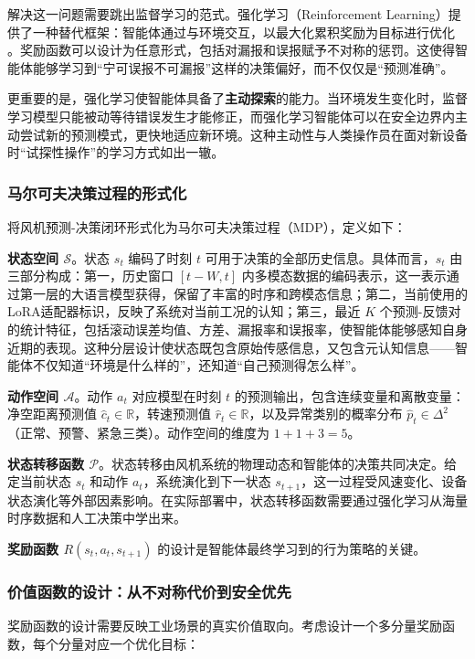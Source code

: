 \documentclass[12pt,a4paper]{article}
\begin{document}
解决这一问题需要跳出监督学习的范式。强化学习（Reinforcement Learning）提供了一种替代框架：智能体通过与环境交互，以最大化累积奖励为目标进行优化 \cite{sutton2018reinforcement}。奖励函数可以设计为任意形式，包括对漏报和误报赋予不对称的惩罚。这使得智能体能够学习到“宁可误报不可漏报”这样的决策偏好，而不仅仅是“预测准确”。

更重要的是，强化学习使智能体具备了\textbf{主动探索}的能力。当环境发生变化时，监督学习模型只能被动等待错误发生才能修正，而强化学习智能体可以在安全边界内主动尝试新的预测模式，更快地适应新环境。这种主动性与人类操作员在面对新设备时“试探性操作”的学习方式如出一辙。

\subsubsection{马尔可夫决策过程的形式化}

将风机预测-决策闭环形式化为马尔可夫决策过程（MDP），定义如下：

\textbf{状态空间 $\mathcal{S}$}。状态 $s_t$ 编码了时刻 $t$ 可用于决策的全部历史信息。具体而言，$s_t$ 由三部分构成：第一，历史窗口 $[t-W, t]$ 内多模态数据的编码表示，这一表示通过第一层的大语言模型获得，保留了丰富的时序和跨模态信息；第二，当前使用的LoRA适配器标识，反映了系统对当前工况的认知；第三，最近 $K$ 个预测-反馈对的统计特征，包括滚动误差均值、方差、漏报率和误报率，使智能体能够感知自身近期的表现。这种分层设计使状态既包含原始传感信息，又包含元认知信息——智能体不仅知道“环境是什么样的”，还知道“自己预测得怎么样”。

\textbf{动作空间 $\mathcal{A}$}。动作 $a_t$ 对应模型在时刻 $t$ 的预测输出，包含连续变量和离散变量：净空距离预测值 $\hat{c}_t \in \mathbb{R}$，转速预测值 $\hat{r}_t \in \mathbb{R}$，以及异常类别的概率分布 $\hat{p}_t \in \Delta^2$（正常、预警、紧急三类）。动作空间的维度为 $1 + 1 + 3 = 5$。

\textbf{状态转移函数 $\mathcal{P}$}。状态转移由风机系统的物理动态和智能体的决策共同决定。给定当前状态 $s_t$ 和动作 $a_t$，系统演化到下一状态 $s_{t+1}$，这一过程受风速变化、设备状态演化等外部因素影响。在实际部署中，状态转移函数需要通过强化学习从海量时序数据和人工决策中学出来。

\textbf{奖励函数 $R(s_t, a_t, s_{t+1})$} 的设计是智能体最终学习到的行为策略的关键。

\subsubsection{价值函数的设计：从不对称代价到安全优先}

奖励函数的设计需要反映工业场景的真实价值取向。考虑设计一个多分量奖励函数，每个分量对应一个优化目标：
\end{document}
